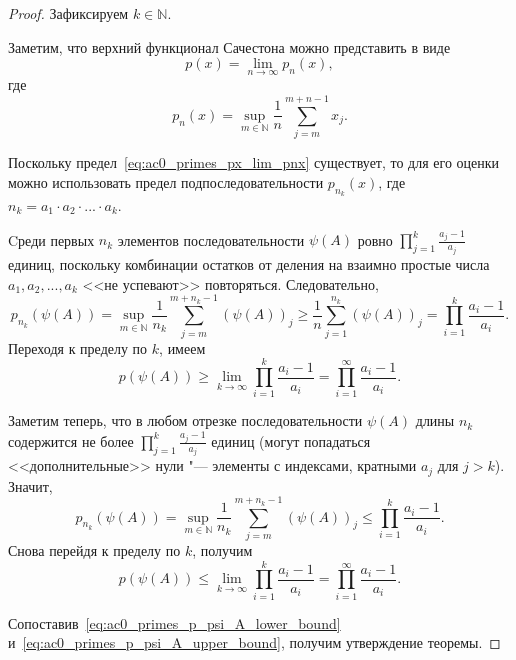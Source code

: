 \documentclass[a4paper,openbib]{article}
\renewcommand{\leq}{\leqslant}
\renewcommand{\geq}{\geqslant} %
\theoremstyle{definition}
\begin{document}
\begin{proof}
	Зафиксируем $k\in\mathbb{N}$.

	Заметим, что верхний функционал Сачестона можно представить в виде
	\begin{equation}
		\label{eq:ac0_primes_px_lim_pnx}
		p(x) = \lim_{n\to\infty} p_n(x)
		,
	\end{equation}
	где
	\begin{equation}
		p_n(x) = \sup_{m\in\mathbb{N}}  \frac{1}{n} \sum_{j=m}^{m+n-1} x_j
		.
	\end{equation}

	Поскольку предел~\eqref{eq:ac0_primes_px_lim_pnx} существует, то для его оценки можно использовать предел подпоследовательности
	$p_{n_k}(x)$, где $n_k = a_1\cdot a_2 \cdot ... \cdot a_k$.


	Cреди первых $n_k$ элементов последовательности $\psi(A)$
	ровно $\prod_{j=1}^k \frac{a_j-1}{a_j}$ единиц, поскольку комбинации остатков от деления
	на взаимно простые числа $a_1, a_2, ..., a_k$ <<не успевают>> повторяться.
	Следовательно,
	\begin{equation}
		p_{n_k}(\psi(A)) =
		\sup_{m\in\mathbb{N}}  \frac{1}{n_k} \sum_{j=m}^{m+n_k-1} (\psi(A))_j
		\geq
		\frac{1}{n} \sum_{j=1}^{n_k} (\psi(A))_j
		=
		\prod_{i=1}^k \frac{a_i-1}{a_i}
		.
	\end{equation}
	Переходя к пределу по $k$, имеем
	\begin{equation}
		\label{eq:ac0_primes_p_psi_A_lower_bound}
		p(\psi(A)) \geq \lim_{k\to \infty} \prod_{i=1}^k \frac{a_i-1}{a_i}
		=
		\prod_{i=1}^\infty \frac{a_i-1}{a_i}
		.
	\end{equation}

	Заметим теперь, что в любом отрезке последовательности $\psi(A)$ длины $n_k$
	содержится не более $\prod_{j=1}^k \frac{a_j-1}{a_j}$ единиц
	(могут попадаться <<дополнительные>> нули "--- элементы с индексами, кратными $a_j$ для $j>k$).
	Значит,
	\begin{equation}
		p_{n_k}(\psi(A)) =
		\sup_{m\in\mathbb{N}}  \frac{1}{n_k} \sum_{j=m}^{m+n_k-1} (\psi(A))_j
		\leq
		\prod_{i=1}^k \frac{a_i-1}{a_i}
		.
	\end{equation}
	Снова перейдя к пределу по $k$, получим
	\begin{equation}
		\label{eq:ac0_primes_p_psi_A_upper_bound}
		p(\psi(A)) \leq \lim_{k\to \infty} \prod_{i=1}^k \frac{a_i-1}{a_i}
		=
		\prod_{i=1}^\infty \frac{a_i-1}{a_i}
		.
	\end{equation}

	Сопоставив~\eqref{eq:ac0_primes_p_psi_A_lower_bound} и~\eqref{eq:ac0_primes_p_psi_A_upper_bound}, получим утверждение теоремы.
\end{proof}
\end{document}
